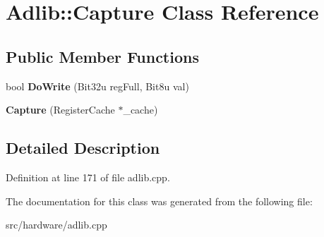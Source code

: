 \hypertarget{classAdlib_1_1Capture}{\section{Adlib\-:\-:Capture Class Reference}
\label{classAdlib_1_1Capture}
}
\subsection*{Public Member Functions}
\begin{DoxyCompactItemize}
\item 
\hypertarget{classAdlib_1_1Capture_a2bc4e88dfc7ead50b3cd50fded3cfbaa}{bool {\bfseries Do\-Write} (Bit32u reg\-Full, Bit8u val)}\label{classAdlib_1_1Capture_a2bc4e88dfc7ead50b3cd50fded3cfbaa}

\item 
\hypertarget{classAdlib_1_1Capture_a42d440dbc3803819534a51e9434c8f4e}{{\bfseries Capture} (Register\-Cache $\ast$\-\_\-cache)}\label{classAdlib_1_1Capture_a42d440dbc3803819534a51e9434c8f4e}

\end{DoxyCompactItemize}


\subsection{Detailed Description}


Definition at line 171 of file adlib.\-cpp.



The documentation for this class was generated from the following file\-:\begin{DoxyCompactItemize}
\item 
src/hardware/adlib.\-cpp\end{DoxyCompactItemize}
